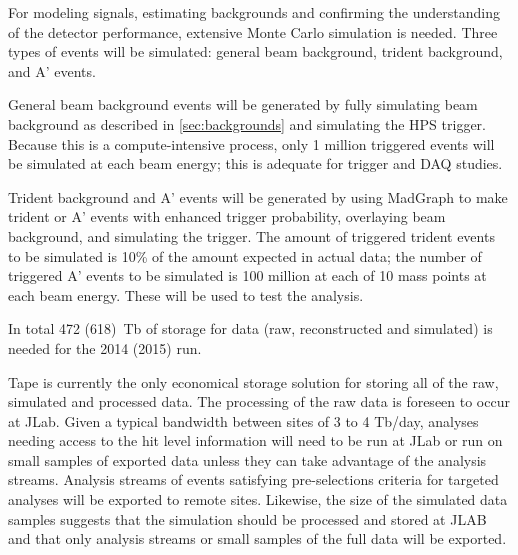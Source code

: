 For modeling signals, estimating backgrounds and confirming the understanding of the detector 
performance, extensive Monte Carlo simulation is needed. 
Three types of events will be simulated: general beam background, trident background, and A' events.

General beam background events will be generated by fully simulating beam background as described in \ref{sec:backgrounds} and simulating the HPS trigger. 
Because this is a compute-intensive process, only 1 million triggered events will be simulated at each beam energy; this is adequate for trigger and DAQ studies.

Trident background and A' events will be generated by using MadGraph to make trident or A' events 
with enhanced trigger probability, overlaying beam background, and simulating the trigger.
The amount of triggered trident events to be simulated is 10\% of the amount expected in actual data; 
the number of triggered A' events to be simulated is 100 million at each of 10 mass points at each beam energy. 
These will be used to test the analysis.

In total 472 (618)~Tb of storage for data (raw, reconstructed and simulated) is needed for the 2014 (2015) run.

Tape is currently the only economical storage
solution for storing all of the raw, simulated and processed data.
The processing of the raw data is foreseen to occur at JLab. Given a
typical bandwidth between sites of 3 to 4 Tb/day, analyses needing
access to the hit level information will need to be run at JLab or run
on small samples of exported data unless they can take advantage of the
analysis streams. Analysis streams of events satisfying
pre-selections criteria for targeted analyses will be exported to remote
sites. Likewise, the size of the simulated data samples suggests that
the simulation should be processed and stored at JLAB and that 
only analysis streams or small samples of the full data will be
exported.

